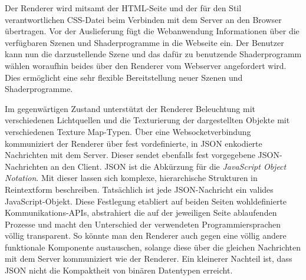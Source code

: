 Der Renderer wird mitsamt der HTML-Seite und der für den Stil verantwortlichen CSS-Datei beim Verbinden mit dem Server an den Browser übertragen. Vor der Auslieferung fügt die Webanwendung Informationen über die verfügbaren Szenen und Shaderprogramme in die Webseite ein. Der Benutzer kann nun die darzustellende Szene und das dafür zu benutzende Shaderprogramm wählen woraufhin beides über den Renderer vom Webserver angefordert wird. Dies ermöglicht eine sehr flexible Bereitstellung neuer Szenen und Shaderprogramme.

Im gegenwärtigen Zustand unterstützt der Renderer Beleuchtung mit verschiedenen Lichtquellen und die Texturierung der dargestellten Objekte mit verschiedenen Texture Map-Typen. Über eine Websocketverbindung kommuniziert der Renderer über fest vordefinierte, in JSON enkodierte Nachrichten mit dem Server. Dieser sendet ebenfalls fest vorgegebene JSON-Nachrichten an den Client. JSON ist die Abkürzung für die \textit{JavaScript Object Notation}. Mit dieser lassen sich komplexe, hierarchische Strukturen in Reintextform beschreiben. Tatsächlich ist jede JSON-Nachricht ein valides JavaScript-Objekt. Diese Festlegung etabliert auf beiden Seiten wohldefinierte Kommunikations-APIs, abstrahiert die auf der jeweiligen Seite ablaufenden Prozesse und macht den Unterschied der verwendeten Programmiersprachen völlig transparent. So könnte man den Renderer auch gegen eine völlig andere funktionale Komponente austauschen, solange diese über die gleichen Nachrichten mit dem Server kommuniziert wie der Renderer. Ein kleinerer Nachteil ist, dass JSON nicht die Kompaktheit von binären Datentypen erreicht.

